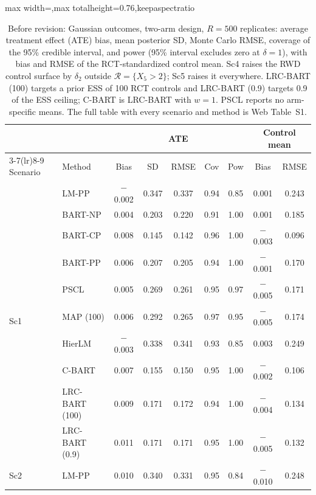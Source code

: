 \documentclass[11pt]{article}
\theoremstyle{definition}
\theoremstyle{plain}
\begin{document}
\clearpage
{\color{red}
\begin{table}[htbp]\color{red}
\centering
\caption*{Before revision: Gaussian outcomes, two-arm design, $R=500$ replicates: average treatment effect (ATE) bias, mean posterior SD, Monte Carlo RMSE, coverage of the 95\% credible interval, and power (95\% interval excludes zero at $\delta=1$), with bias and RMSE of the RCT-standardized control mean. Sc4 raises the RWD control surface by $\delta_2$ outside $\mathcal R=\{X_5>2\}$; Sc5 raises it everywhere. LRC-BART (100) targets a prior ESS of 100 RCT controls and LRC-BART (0.9) targets 0.9 of the ESS ceiling; C-BART is LRC-BART with $w=1$. PSCL reports no arm-specific means. The full table with every scenario and method is Web Table~S1.}

\scriptsize
\setlength{\tabcolsep}{3pt}
\renewcommand{\arraystretch}{0.8}
\begin{adjustbox}{max width=\textwidth,max totalheight=0.76\textheight,keepaspectratio}
\begin{tabular}{llccccccc}
\toprule
& & \multicolumn{5}{c}{ATE} & \multicolumn{2}{c}{Control mean} \\
\cmidrule(lr){3-7}\cmidrule(lr){8-9}
Scenario & Method & Bias & SD & RMSE & Cov & Pow & Bias & RMSE \\
\midrule
\multirow{10}{*}{Sc1} & LM-PP & $-$0.002 & 0.347 & 0.337 & 0.94 & 0.85 & 0.001 & 0.243 \\
& BART-NP & 0.004 & 0.203 & 0.220 & 0.91 & 1.00 & 0.001 & 0.185 \\
& BART-CP & 0.008 & 0.145 & 0.142 & 0.96 & 1.00 & $-$0.003 & 0.096 \\
& BART-PP & 0.006 & 0.207 & 0.205 & 0.94 & 1.00 & $-$0.001 & 0.170 \\
& PSCL & 0.005 & 0.269 & 0.261 & 0.95 & 0.97 & $-$0.005 & 0.171 \\
& MAP (100) & 0.006 & 0.292 & 0.265 & 0.97 & 0.95 & $-$0.005 & 0.174 \\
& HierLM & $-$0.003 & 0.338 & 0.341 & 0.93 & 0.85 & 0.003 & 0.249 \\
& C-BART & 0.007 & 0.155 & 0.150 & 0.95 & 1.00 & $-$0.002 & 0.106 \\
& LRC-BART (100) & 0.009 & 0.171 & 0.172 & 0.94 & 1.00 & $-$0.004 & 0.134 \\
& LRC-BART (0.9) & 0.011 & 0.171 & 0.171 & 0.95 & 1.00 & $-$0.005 & 0.132 \\
\midrule
\multirow{10}{*}{Sc2} & LM-PP & 0.010 & 0.340 & 0.331 & 0.95 & 0.84 & $-$0.010 & 0.248 \\

\end{tabular}
\end{adjustbox}
\end{table}}
\end{document}
